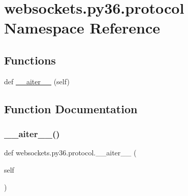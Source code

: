 \hypertarget{namespacewebsockets_1_1py36_1_1protocol}{}\section{websockets.\+py36.\+protocol Namespace Reference}
\label{namespacewebsockets_1_1py36_1_1protocol}
\subsection*{Functions}
\begin{DoxyCompactItemize}
\item 
def \hyperlink{namespacewebsockets_1_1py36_1_1protocol_a733f9cfe146e329dcf93fcd576a50274}{\+\_\+\+\_\+aiter\+\_\+\+\_\+} (self)
\end{DoxyCompactItemize}


\subsection{Function Documentation}
\mbox{\label{namespacewebsockets_1_1py36_1_1protocol_a733f9cfe146e329dcf93fcd576a50274}} 
\subsubsection{\texorpdfstring{\+\_\+\+\_\+aiter\+\_\+\+\_\+()}{\_\_aiter\_\_()}}
{\footnotesize\ttfamily def websockets.\+py36.\+protocol.\+\_\+\+\_\+aiter\+\_\+\+\_\+ (\begin{DoxyParamCaption}\item[{}]{self }\end{DoxyParamCaption})}

